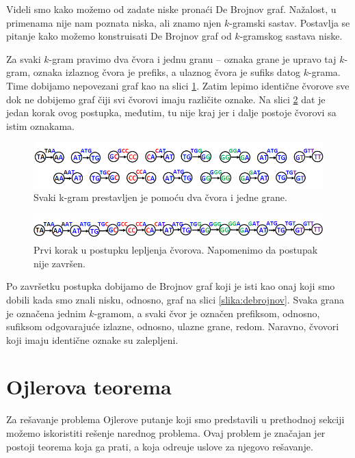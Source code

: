 Videli smo kako mo\v zemo od zadate niske prona\'ci De Brojnov graf. Na\v zalost, u primenama nije nam poznata niska, ali znamo njen $k$-gramski sastav. Postavlja se pitanje kako mo\v zemo konstruisati De Brojnov graf od $k$-gramskog sastava niske. 

Za svaki $k$-gram pravimo dva čvora i jednu granu -- oznaka grane je upravo taj $k$-gram, oznaka izlaznog \v cvora je prefiks, a ulaznog \v cvora je sufiks datog $k$-grama. Time dobijamo nepovezani graf kao na slici \ref{slika:kgrami}. Zatim lepimo identične čvorove sve dok ne dobijemo graf čiji svi čvorovi imaju različite oznake. Na slici \ref{slika:lepljenje} dat je jedan korak ovog postupka, međutim, tu nije kraj jer i dalje postoje čvorovi sa istim oznakama.

\begin{figure}[h]
	\centering
	\includegraphics[width=1\textwidth]{poglavlja/3/slike/debrojnov1.png}
	\caption{Svaki k-gram prestavljen je pomoću dva čvora i jedne grane.}
	\label{slika:kgrami}
\end{figure} 

\begin{figure}[h]
	\centering
	\includegraphics[width=1\textwidth]{poglavlja/3/slike/lepljenje.png}
	\caption{Prvi korak u postupku lepljenja čvorova. Napomenimo da postupak nije završen.}
	\label{slika:lepljenje}
\end{figure} 

Po završetku postupka dobijamo de Brojnov graf koji je isti kao onaj koji smo dobili kada smo znali nisku, odnosno, graf na slici \ref{slika:debrojnov}. Svaka grana je označena jednim $k$-gramom, a svaki čvor je označen prefiksom, odnosno, sufiksom odgovaraju\'ce izlazne, odnosno, ulazne grane, redom. Naravno, \v cvovori koji imaju identi\v cne oznake su zalepljeni.

\section{Ojlerova teorema}

Za re\v savanje problema Ojlerove putanje koji smo predstavili u prethodnoj sekciji mo\v zemo iskoristiti re\v senje narednog problema. Ovaj problem je zna\v cajan jer postoji teorema koja ga prati, a koja odre\dj uje uslove za njegovo re\v savanje.

